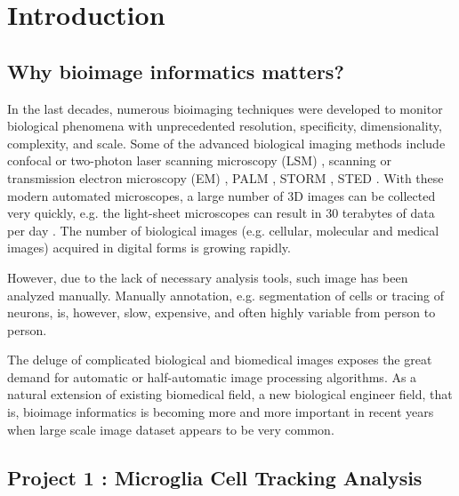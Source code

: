 \chapter{Introduction}
\section{Why bioimage informatics matters?}
In the last decades, numerous bioimaging techniques were developed to monitor biological phenomena with unprecedented resolution, specificity, dimensionality, complexity, and scale. Some of the advanced biological imaging methods include confocal or two-photon laser scanning microscopy (LSM) \cite{pawley1995handbook}, scanning or transmission electron microscopy (EM) \cite{bozzola1999electron}, PALM \cite{betzig2006imaging}, STORM \cite{rust2006sub}, STED \cite{hell2003toward}. With these modern automated microscopes, a large number of 3D images can be collected very quickly, e.g. the light-sheet microscopes can result in 30 terabytes of data per day \cite{keller2008reconstruction}. The number of biological images (e.g. cellular, molecular and medical images) acquired in digital forms is growing rapidly. 

However, due to the lack of necessary analysis tools, such image has been analyzed manually. Manually annotation, e.g. segmentation of cells or tracing of neurons, is, however, slow, expensive, and often highly variable from person to person.

The deluge of complicated biological and biomedical images exposes the great demand for automatic or half-automatic image processing algorithms. As a natural extension of existing biomedical field, a new biological engineer field, that is, bioimage informatics is becoming more and more important in recent years when large scale image dataset appears to be very common.


\section{Project 1 : Microglia Cell Tracking Analysis}

